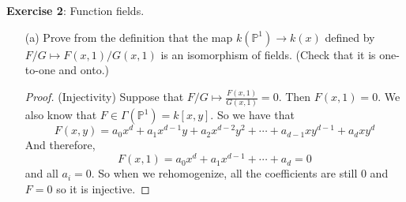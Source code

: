 \documentclass{article}
\begin{document}
\textbf{Exercise 2}: Function fields.
    \begin{itemize}
        \item [(a)] Prove from the definition that the map $k(\mathbb{P}^{1}) \rightarrow k(x)$ defined by $F/G \mapsto F(x, 1)/G(x, 1)$ is an isomorphism of fields. (Check that it is one-to-one and onto.)
            \begin{proof}
                (Injectivity) Suppose that $F/G \mapsto \frac{F(x, 1)}{G(x, 1)} = 0$. Then $F(x, 1) = 0$. We also know that $F \in \Gamma( \mathbb{P}^{1}) = k[x, y]$. So we have that
                    \begin{equation*}
                        F(x, y) = a_{0}x^{d} + a_{1}x^{d - 1}y + a_{2}x^{d - 2}y^{2} + \cdots + a_{ d - 1}xy^{d - 1} + a_{d}xy^{d}
                    \end{equation*}
                And therefore,
                    \begin{equation*}
                        F(x, 1) = a_{0}x^{d} + a_{1}x^{d - 1} + \cdots + a_{ d} = 0
                    \end{equation*}
                and all $a_{i} = 0$. So when we rehomogenize, all the coefficients are still $0$ and $F = 0$ so it is injective.


\end{proof}
\end{itemize}
\end{document}
